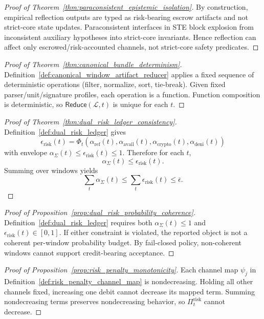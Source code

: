 \documentclass[11pt]{article}
\theoremstyle{definition}
\theoremstyle{plain}
\newcommand{\STE}{\textsf{STE}}
\newcommand{\erisk}{\epsilon_{\mathrm{risk}}}
\newcommand{\PiRisk}{\Pi^{\mathrm{risk}}}
\begin{document}
\begin{proof}[Proof of Theorem~\ref{thm:paraconsistent_epistemic_isolation}]
By construction, empirical reflection outputs are typed as risk-bearing escrow artifacts and not strict-core state updates.
Paraconsistent interfaces in \STE{} block explosion from inconsistent auxiliary hypotheses into strict-core invariants.
Hence reflection can affect only escrowed/risk-accounted channels, not strict-core safety predicates.
\end{proof}

\begin{proof}[Proof of Theorem~\ref{thm:canonical_bundle_determinism}]
Definition~\ref{def:canonical_window_artifact_reducer} applies a fixed sequence of deterministic operations (filter, normalize, sort, tie-break).
Given fixed parser/unit/signature profiles, each operation is a function.
Function composition is deterministic, so $\mathsf{Reduce}(\mathcal{L},t)$ is unique for each $t$.
\end{proof}

\begin{proof}[Proof of Theorem~\ref{thm:dual_risk_ledger_consistency}]
Definition~\ref{def:dual_risk_ledger} gives
\[
\erisk(t)=\Phi_t(\alpha_{\mathrm{ref}}(t),\alpha_{\mathrm{avail}}(t),\alpha_{\mathrm{crypto}}(t),\alpha_{\mathrm{deni}}(t))
\]
with envelope $\alpha_{\Sigma}(t)\le \erisk(t)\le 1$.
Therefore for each $t$,
\[
\alpha_{\Sigma}(t)\le \erisk(t).
\]
Summing over windows yields
\[
\sum_t\alpha_{\Sigma}(t)\le \sum_t\erisk(t)\le \bar\epsilon.
\]
\end{proof}

\begin{proof}[Proof of Proposition~\ref{prop:dual_risk_probability_coherence}]
Definition~\ref{def:dual_risk_ledger} requires both $\alpha_{\Sigma}(t)\le 1$ and $\erisk(t)\in[0,1]$.
If either constraint is violated, the reported object is not a coherent per-window probability budget.
By fail-closed policy, non-coherent windows cannot support credit-bearing acceptance.
\end{proof}

\begin{proof}[Proof of Proposition~\ref{prop:risk_penalty_monotonicity}]
Each channel map $\psi_j$ in Definition~\ref{def:risk_penalty_channel_map} is nondecreasing.
Holding all other channels fixed, increasing one debit cannot decrease its mapped term.
Summing nondecreasing terms preserves nondecreasing behavior, so $\PiRisk_t$ cannot decrease.
\end{proof}
\end{document}
